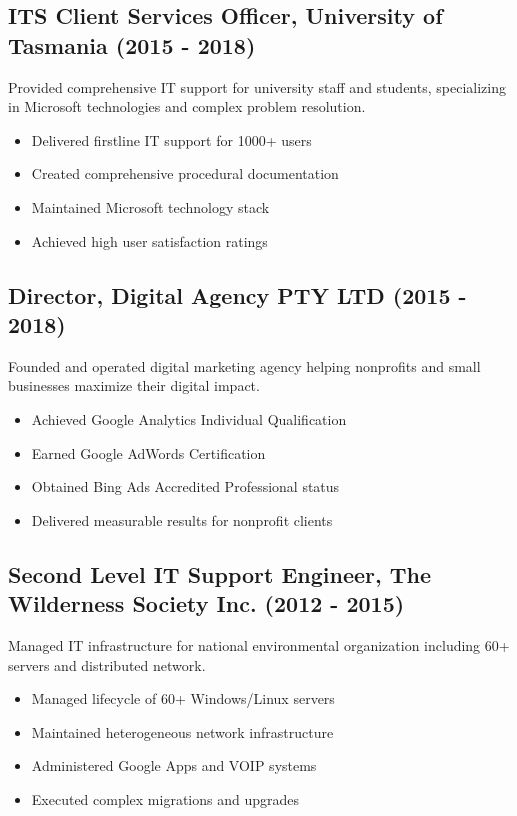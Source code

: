 \documentclass{article}
\begin{document}
\subsection*{ITS Client Services Officer, University of Tasmania (2015 - 2018)}
Provided comprehensive IT support for university staff and students, specializing in Microsoft technologies and complex problem resolution.
\begin{itemize}
    \item Delivered firstline IT support for 1000+ users
    \item Created comprehensive procedural documentation
    \item Maintained Microsoft technology stack
    \item Achieved high user satisfaction ratings
\end{itemize}

\subsection*{Director, Digital Agency PTY LTD (2015 - 2018)}
Founded and operated digital marketing agency helping nonprofits and small businesses maximize their digital impact.
\begin{itemize}
    \item Achieved Google Analytics Individual Qualification
    \item Earned Google AdWords Certification
    \item Obtained Bing Ads Accredited Professional status
    \item Delivered measurable results for nonprofit clients
\end{itemize}

\subsection*{Second Level IT Support Engineer, The Wilderness Society Inc. (2012 - 2015)}
Managed IT infrastructure for national environmental organization including 60+ servers and distributed network.
\begin{itemize}
    \item Managed lifecycle of 60+ Windows/Linux servers
    \item Maintained heterogeneous network infrastructure
    \item Administered Google Apps and VOIP systems
    \item Executed complex migrations and upgrades
\end{itemize}
\end{document}
